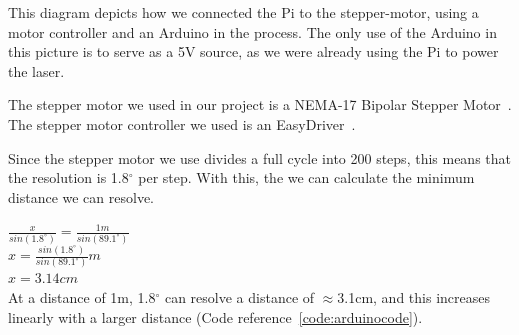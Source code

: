 This diagram depicts how we connected the Pi to the stepper-motor, using a motor controller and an Arduino in the process.
The only use of the Arduino in this picture is to serve as a 5V source, as we were already using the Pi to power the laser.

The stepper motor we used in our project is a NEMA-17 Bipolar Stepper Motor~\cite{steppermotor}.
The stepper motor controller we used is an EasyDriver~\cite{steppercontroller}.



Since the stepper motor we use divides a full cycle into 200 steps, this means that the resolution is 1.8$^\circ$ per step. With this, the we can calculate the minimum distance we can resolve.

$\frac{x}{sin(1.8^\circ)} = \frac{1m}{sin(89.1^\circ)}$ \\
$x = \frac{sin(1.8^\circ)}{sin(89.1^\circ)}m$ \\
$x = 3.14cm$ \\

At a distance of 1m, 1.8$^\circ$ can resolve a distance of $\approx$3.1cm, and this increases linearly with a larger distance (Code reference~\ref{code:arduinocode}).
